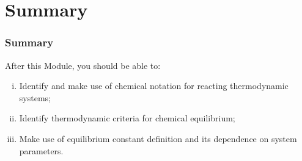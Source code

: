 \documentclass[10pt,compress,unknownkeysallowed]{beamer}
\begin{document}
\section{Summary}

\begin{frame}
 \frametitle{Summary}
   After this Module, you should be able to:
   \begin{enumerate}[(i)]
     \item Identify and make use of chemical notation for reacting thermodynamic systems;
     \item Identify thermodynamic criteria for chemical equilibrium;
     \item Make use of equilibrium constant definition and its dependence on system parameters.
   \end{enumerate}
\end{frame}
\end{document}
